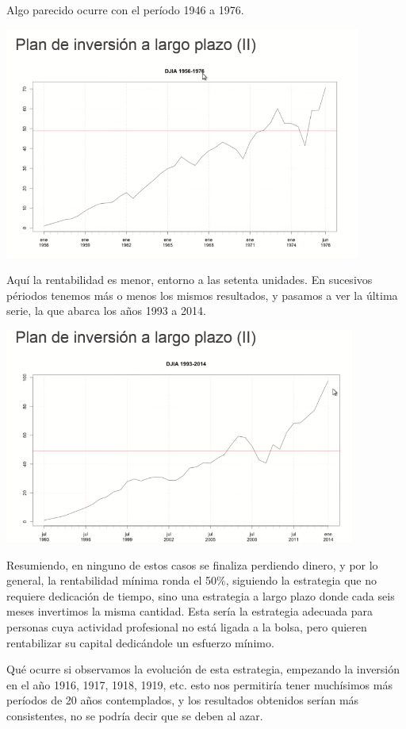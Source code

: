 Algo parecido ocurre con el período 1946 a 1976.

\begin{center}
    \includegraphics[scale=.65]{images/mod03-08.png}
\end{center}
Aquí la rentabilidad es menor, entorno a las setenta unidades. En sucesivos périodos tenemos más o menos los mismos resultados, y pasamos a ver la última serie, la que abarca los años 1993 a 2014.

\begin{center}
    \includegraphics[scale=.65]{images/mod03-09.png}
\end{center}

Resumiendo, en ninguno de estos casos se finaliza perdiendo dinero, y por lo general, la rentabilidad mínima ronda el 50\%, siguiendo la estrategia que no requiere dedicación de tiempo, sino una estrategia  a largo plazo donde cada seis meses invertimos la misma cantidad. Esta sería la estrategia adecuada para personas cuya actividad profesional no está ligada a la bolsa, pero quieren rentabilizar su capital dedicándole un esfuerzo mínimo.

Qué ocurre si observamos la evolución de esta estrategia, empezando la inversión en el año 1916, 1917, 1918, 1919, etc. esto nos permitiría tener muchísimos más períodos de 20 años contemplados, y los resultados obtenidos serían más consistentes, no se podría decir que se deben al azar.

